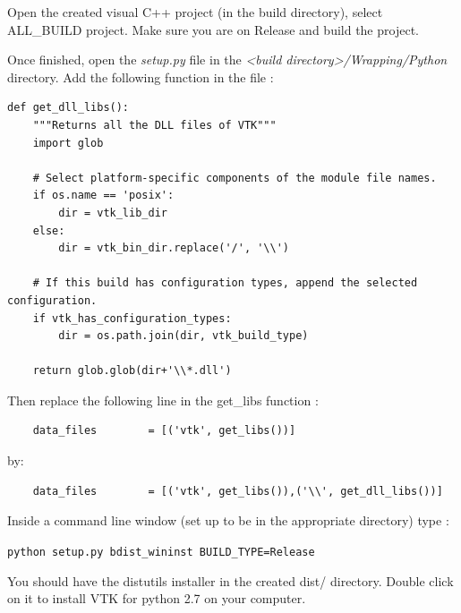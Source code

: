 \documentclass[a4paper,10pt,oneside]{article}
\begin{document}
Open the created visual C++ project (in the build directory), select 
ALL\_BUILD project. Make sure you are on Release and build the project.

Once finished, open the \textit{setup.py} file in the 
\textit{<build directory>/Wrapping/Python} directory. Add the following
function in the file :

\lstset{language=Python}
\begin{lstlisting}
def get_dll_libs():
    """Returns all the DLL files of VTK"""
    import glob

    # Select platform-specific components of the module file names.
    if os.name == 'posix':
        dir = vtk_lib_dir
    else:
        dir = vtk_bin_dir.replace('/', '\\')

    # If this build has configuration types, append the selected configuration.
    if vtk_has_configuration_types:
        dir = os.path.join(dir, vtk_build_type)
    
    return glob.glob(dir+'\\*.dll')
\end{lstlisting}

Then replace the following line in the get\_libs function :

\lstset{language=Python}
\begin{lstlisting}
    data_files        = [('vtk', get_libs())]
\end{lstlisting}

by:

\lstset{language=Python}
\begin{lstlisting}
    data_files        = [('vtk', get_libs()),('\\', get_dll_libs())]
\end{lstlisting}
    
Inside a command line window (set up to be in the appropriate directory)
type :

\texttt{python setup.py bdist\_wininst BUILD\_TYPE=Release}

You should have the distutils installer in the created dist/ directory. Double
click on it to install VTK for python 2.7 on your computer.
\end{document}
